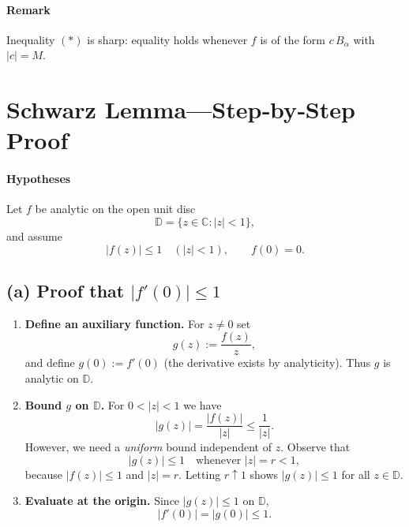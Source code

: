 \documentclass[12pt]{article}
\theoremstyle{definition} %
\theoremstyle{plain} %
\begin{document}
\paragraph{Remark}
Inequality $(\ast)$ is sharp: equality holds whenever $f$ is of the form
$c\,B_\alpha$ with $|c|=M$.

\section*{Schwarz Lemma---Step‑by‑Step Proof}

\paragraph{Hypotheses}  
Let $f$ be analytic on the open unit disc
\[
   \mathbb D=\{z\in\mathbb C : |z|<1\},
\]
and assume
\[
   |f(z)|\le 1 \quad(|z|<1), 
   \qquad
   f(0)=0 .
\]

\subsection*{(a)  Proof that \boldmath$|f'(0)|\le 1$}
\begin{enumerate}
\item \textbf{Define an auxiliary function.}  
      For $z\neq0$ set
      \[
         g(z):=\frac{f(z)}{z},
      \]
      and define $g(0):=f'(0)$ (the derivative exists by analyticity).  
      Thus $g$ is analytic on $\mathbb D$.

\item \textbf{Bound $g$ on $\mathbb D$.}  
      For $0<|z|<1$ we have
      \[
         |g(z)|=\frac{|f(z)|}{|z|}\le\frac{1}{|z|}.
      \]
      However, we need a \emph{uniform} bound independent of $z$.
      Observe that
      \[
          |g(z)|\le 1
          \quad\text{whenever }|z|=r<1,
      \]
      because $|f(z)|\le 1$ and $|z|=r$.  
      Letting $r\uparrow1$ shows $|g(z)|\le 1$ for all $z\in\mathbb D$.

\item \textbf{Evaluate at the origin.}  
      Since $|g(z)|\le 1$ on $\mathbb D$,
      \[
         |f'(0)| = |g(0)| \le 1 .
      \]
\end{enumerate}
\end{document}
